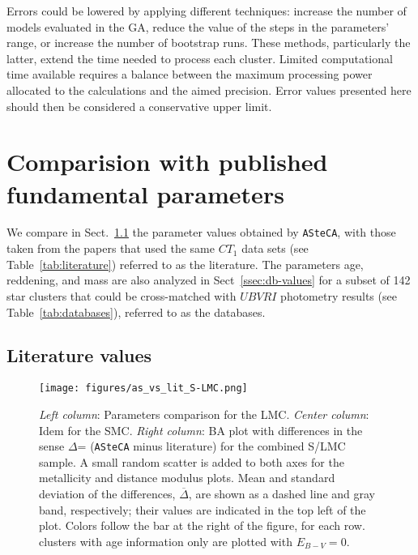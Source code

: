 \documentclass[draft]{aa}
\renewcommand{\includegraphics}[2][]{}
\begin{document}
Errors could be lowered by applying different techniques: increase the
number of models evaluated in the GA, reduce the value of the steps in the
parameters' range, or increase the number of bootstrap runs.
%
These methods, particularly the latter, extend the time needed to process
each cluster. Limited computational time available requires a balance between
the maximum processing power allocated to the calculations and the aimed
precision. Error values presented here should then be considered a conservative
upper limit.





\section{Comparision with published fundamental parameters}
\label{sec:comp-pub-data}

We compare in Sect.~\ref{ssec:lit-values} the parameter values obtained by
\texttt{ASteCA}, with those taken from the papers that used the same
$CT_1$ data sets (see Table~\ref{tab:literature}) referred to as the
literature.
%
The parameters age, reddening, and mass are also analyzed in
Sect~\ref{ssec:db-values} for a subset of 142 star clusters that could be
cross-matched with $UBVRI$ photometry results (see Table~\ref{tab:databases}),
referred to as the databases.

  

\subsection{Literature values}
\label{ssec:lit-values}

\begin{figure*}
\texttt{[image: figures/as\_vs\_lit\_S-LMC.png]}
\caption{\emph{Left column}: Parameters comparison for the LMC.\@
\emph{Center column}: Idem for the SMC.\@
\emph{Right column}: BA plot with differences in the sense $\Delta$= (\texttt
{ASteCA} minus literature) for the combined S/LMC sample.
A small random scatter is added to both axes for the metallicity and distance
modulus plots. Mean and standard deviation of the differences,
$\overline{\Delta}$, are shown as a dashed line and gray band, respectively;
their values are indicated in the top left of the plot.
Colors follow the bar at the right of the figure, for each row.~\cite
{Piatti_2011b} clusters with age information only are plotted
with $E_{B-V}{=}0$.}
\label{fig:as_vs_lit}
\end{figure*}
\end{document}
